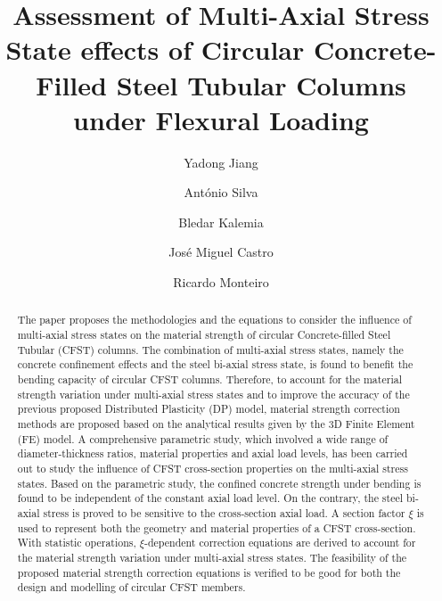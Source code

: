 \documentclass[12pt,a4]{article}
\title{Assessment of Multi-Axial Stress State effects of Circular Concrete-Filled Steel Tubular Columns under Flexural Loading}
\author{Yadong Jiang \and António Silva \and Bledar Kalemia \and José Miguel Castro \and Ricardo Monteiro}
\date{}
\begin{document}
	\maketitle
	
	\begin{abstract}
		The paper proposes the methodologies and the equations to consider the influence of multi-axial stress states on the material strength of circular Concrete-filled Steel Tubular (CFST) columns. The combination of multi-axial stress states, namely the concrete confinement effects and the steel bi-axial stress state, is found to benefit the bending capacity of circular CFST columns. Therefore, to account for the material strength variation under multi-axial stress states and to improve the accuracy of the previous proposed Distributed Plasticity (DP) model, material strength correction methods are proposed based on the analytical results given by the 3D Finite Element (FE) model. A comprehensive parametric study, which involved a wide range of diameter-thickness ratios, material properties and axial load levels, has been carried out to study the influence of CFST cross-section properties on the multi-axial stress states. Based on the parametric study, the confined concrete strength under bending is found to be independent of the constant axial load level. On the contrary, the steel bi-axial stress is proved to be sensitive to the cross-section axial load. A section factor $\xi$ is used to represent both the geometry and material properties of a CFST cross-section. With statistic operations, $\xi$-dependent correction equations are derived to account for the material strength variation under multi-axial stress states. The feasibility of the proposed material strength correction equations is verified to be good for both the design and modelling of circular CFST members.
	\end{abstract}
\end{document}
